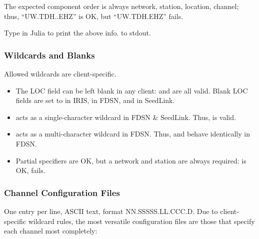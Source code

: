 \documentclass[letterpaper,11pt,english]{sphinxmanual}
\begin{document}
The expected component order is always network, station, location, channel; thus, “UW.TDH..EHZ” is OK, but “UW.TDH.EHZ” fails.

\begin{fulllineitems}
\label{\detokenize{src/Appendices/web_syntax:chanspec}}
\end{fulllineitems}


Type  in Julia to print the above info. to stdout.


\subsubsection{Wildcards and Blanks}
\label{\detokenize{src/Appendices/web_syntax:wildcards-and-blanks}}
Allowed wildcards are client-specific.
\begin{itemize}
\item {} 
The LOC field can be left blank in any client:  and  are all valid. Blank LOC fields are set to \sphinxcode{\sphinxupquote{-{-}}} in IRIS, \sphinxcode{\sphinxupquote{*}} in FDSN, and  in SeedLink.

\item {} 
 acts as a single-character wildcard in FDSN \& SeedLink. Thus,  is valid.

\item {} 
\sphinxcode{\sphinxupquote{*}} acts as a multi-character wildcard in FDSN. Thus,  and  behave identically in FDSN.

\item {} 
Partial specifiers are OK, but a network and station are always required:  is OK,  fails.

\end{itemize}


\subsubsection{Channel Configuration Files}
\label{\detokenize{src/Appendices/web_syntax:channel-configuration-files}}\label{\detokenize{src/Appendices/web_syntax:ccfg}}
One entry per line, ASCII text, format NN.SSSSS.LL.CCC.D. Due to client-specific wildcard rules, the most versatile configuration files are those that specify each channel most completely:
\end{document}
